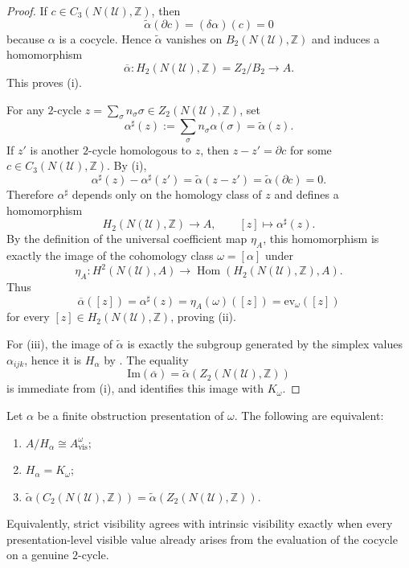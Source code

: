 \begin{proof}
If $c\in C_3(N(\mathcal U),\mathbb Z)$, then
\[
\widetilde\alpha(\partial c)=(\delta\alpha)(c)=0
\]
because $\alpha$ is a cocycle. Hence $\widetilde\alpha$ vanishes on $B_2(N(\mathcal U),\mathbb Z)$ and induces a homomorphism
\[
\overline\alpha:H_2(N(\mathcal U),\mathbb Z)=Z_2/B_2\to A.
\]
This proves \textup{(i)}.

For any $2$-cycle $z=\sum_{\sigma} n_{\sigma}\sigma\in Z_2(N(\mathcal U),\mathbb Z)$, set
\[
\alpha^{\sharp}(z):=\sum_{\sigma} n_{\sigma}\alpha(\sigma)=\widetilde\alpha(z).
\]
If $z'$ is another $2$-cycle homologous to $z$, then $z-z'=\partial c$ for some $c\in C_3(N(\mathcal U),\mathbb Z)$. By \textup{(i)},
\[
\alpha^{\sharp}(z)-\alpha^{\sharp}(z')
=
\widetilde\alpha(z-z')
=
\widetilde\alpha(\partial c)
=
0.
\]
Therefore $\alpha^{\sharp}$ depends only on the homology class of $z$ and defines a homomorphism
\[
H_2(N(\mathcal U),\mathbb Z)\to A,\qquad
[z]\longmapsto \alpha^{\sharp}(z).
\]
By the definition of the universal coefficient map $\eta_A$, this homomorphism is exactly the image of the cohomology class $\omega=[\alpha]$ under
\[
\eta_A:H^2(N(\mathcal U),A)\to \operatorname{Hom}(H_2(N(\mathcal U),\mathbb Z),A).
\]
Thus
\[
\overline\alpha([z])=\alpha^{\sharp}(z)=\eta_A(\omega)([z])=\mathrm{ev}_{\omega}([z])
\]
for every $[z]\in H_2(N(\mathcal U),\mathbb Z)$, proving \textup{(ii)}.

For \textup{(iii)}, the image of $\widetilde\alpha$ is exactly the subgroup generated by the simplex values $\alpha_{ijk}$, hence it is $H_\alpha$ by . The equality
\[
\mathrm{Im}(\overline\alpha)=\widetilde\alpha(Z_2(N(\mathcal U),\mathbb Z))
\]
is immediate from \textup{(i)}, and  identifies this image with $K_{\omega}$.
\end{proof}

\begin{corollary}\label{cor:strict-intrinsic-coincidence-criterion}
Let $\alpha$ be a finite obstruction presentation of $\omega$. The following are equivalent:
\begin{enumerate}[label=(\roman*),nosep]
\item $A/H_\alpha\cong A_{\mathrm{vis}}^{\omega}$;
\item $H_\alpha=K_{\omega}$;
\item $\widetilde\alpha(C_2(N(\mathcal U),\mathbb Z))=\widetilde\alpha(Z_2(N(\mathcal U),\mathbb Z))$.
\end{enumerate}
Equivalently, strict visibility agrees with intrinsic visibility exactly when every presentation-level visible value already arises from the evaluation of the cocycle on a genuine $2$-cycle.
\end{corollary}

